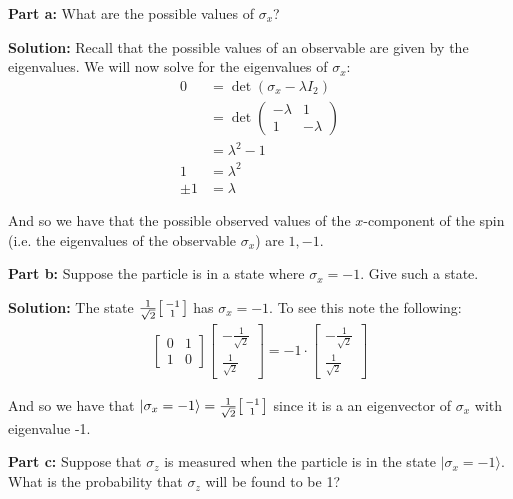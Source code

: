 \documentclass{article}
\newcommand{\icol}[1]{%
  \begin{bsmallmatrix}#1\end{bsmallmatrix}%
}
\begin{document}
\noindent\textbf{Part a:} What are the possible values of $\sigma_x$?
\bigskip

\noindent\textbf{Solution:} Recall that the possible values of an observable are given by the eigenvalues. We will now solve for the eigenvalues of $\sigma_x$:
\begin{align*}
    0&=\det(\sigma_x-\lambda I_2)\tag{characteristic equation}\\
    &=\det\begin{pmatrix}
        -\lambda&1\\1&-\lambda
    \end{pmatrix}\\
    &=\lambda^2-1\tag{det. of $2\times2$ matrix}\\
    1&=\lambda^2\\
    \pm1&=\lambda
\end{align*}

And so we have that the possible observed values of the $x$-component of the spin (i.e. the eigenvalues of the observable $\sigma_x$) are $1,-1$.
\bigskip

\noindent\textbf{Part b:} Suppose the particle is in a state where $\sigma_x=-1$. Give such a state.
\bigskip

\noindent\textbf{Solution:} The state $\frac{1}{\sqrt{2}}\icol{-1\\1}$ has $\sigma_x=-1$. To see this note the following:
\begin{align*}
    \begin{bmatrix}
        0&1\\1&0
    \end{bmatrix}\begin{bmatrix}
        -\frac{1}{\sqrt{2}}\\\frac{1}{\sqrt{2}}
    \end{bmatrix}=-1\cdot\begin{bmatrix}
        -\frac{1}{\sqrt{2}}\\\frac{1}{\sqrt{2}}
    \end{bmatrix}
\end{align*} 

And so we have that $|\sigma_x=-1\rangle=\frac{1}{\sqrt{2}}\icol{-1\\1}$ since it is a an eigenvector of $\sigma_x$ with eigenvalue -1.
\bigskip

\noindent\textbf{Part c:} Suppose that $\sigma_z$ is measured when the particle is in the state $|\sigma_x=-1\rangle$. What is the
probability that $\sigma_z$ will be found to be 1?
\bigskip
\end{document}
